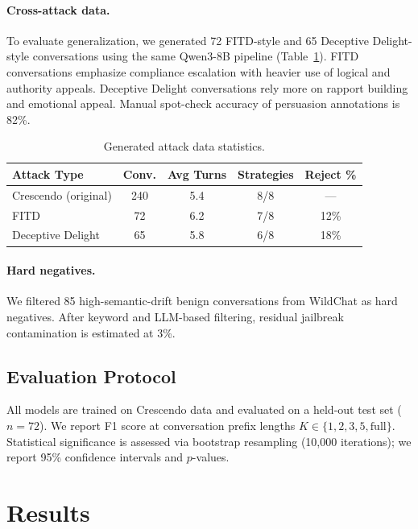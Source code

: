 \documentclass[11pt,a4paper]{article}
\begin{document}
\paragraph{Cross-attack data.}
To evaluate generalization, we generated 72 FITD-style and 65 Deceptive Delight-style conversations using the same Qwen3-8B pipeline (Table~\ref{tab:attack_gen}).
FITD conversations emphasize compliance escalation with heavier use of logical and authority appeals.
Deceptive Delight conversations rely more on rapport building and emotional appeal.
Manual spot-check accuracy of persuasion annotations is 82\%.

\begin{table}[t]
\centering
\small
\caption{Generated attack data statistics.}
\label{tab:attack_gen}
\begin{tabular}{lcccc}
\toprule
\textbf{Attack Type} & \textbf{Conv.} & \textbf{Avg Turns} & \textbf{Strategies} & \textbf{Reject \%} \\
\midrule
Crescendo (original) & 240 & 5.4 & 8/8 & --- \\
FITD & 72 & 6.2 & 7/8 & 12\% \\
Deceptive Delight & 65 & 5.8 & 6/8 & 18\% \\
\bottomrule
\end{tabular}
\end{table}

\paragraph{Hard negatives.}
We filtered 85 high-semantic-drift benign conversations from WildChat \citep{wildchat2024} as hard negatives.
After keyword and LLM-based filtering, residual jailbreak contamination is estimated at 3\%.

\subsection{Evaluation Protocol}

All models are trained on Crescendo data and evaluated on a held-out test set ($n{=}72$).
We report F1 score at conversation prefix lengths $K \in \{1, 2, 3, 5, \text{full}\}$.
Statistical significance is assessed via bootstrap resampling (10,000 iterations); we report 95\% confidence intervals and $p$-values.

\section{Results}
\end{document}
